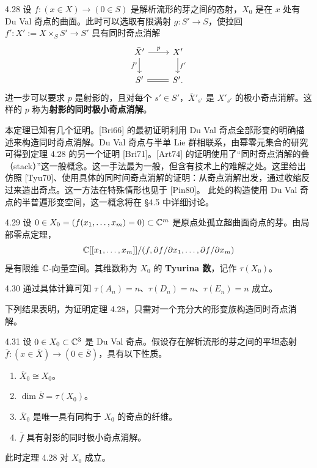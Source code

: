 \begin{theorem*}{4.28}
设 $f\colon (x\in X)\to(0\in S)$ 是解析流形的芽之间的态射，$X_0$ 是在 $x$ 处有 Du Val 奇点的曲面。此时可以选取有限满射 $g\colon S'\to S$，使拉回 $f'\colon X':=X\times_S S'\to S'$ 具有同时奇点消解
\[
\begin{tikzcd}
\bar X' \arrow[r,"p"] \arrow[d,"\bar f'"'] & X' \arrow[d,"f'"] \\
S' \arrow[r,equal] & S' .
\end{tikzcd}
\]
进一步可以要求 $p$ 是射影的，且对每个 $s'\in S'$，$\bar X'_{s'}$ 是 $X'_{s'}$ 的极小奇点消解。这样的 $p$ 称为\textbf{射影的同时极小奇点消解}。
\end{theorem*}

本定理已知有几个证明。[Bri66] 的最初证明利用 Du Val 奇点全部形变的明确描述来构造同时奇点消解。Du Val 奇点与半单 Lie 群相联系，由幂零元集合的研究可得到定理 4.28 的另一个证明 [Bri71]。[Art74] 的证明使用了“同时奇点消解的叠（stack）”这一般概念。这一手法最为一般，但含有技术上的难解之处。这里给出仿照 [Tyu70]、使用具体的同时间奇点消解的证明：从奇点消解出发，通过收缩反过来造出奇点。这一方法在特殊情形也见于 [Pin80]。
此处的构造使用 Du Val 奇点的半普遍形变空间，这一概念将在 \S4.5 中详细讨论。

\begin{definition}{4.29}
设 $0\in X_0=(f(x_1,\dots,x_m)=0)\subset\mathbb{C}^m$ 是原点处孤立超曲面奇点的芽。由局部零点定理，
\[
\mathbb{C}[[x_1,\dots,x_m]]/(f,\partial f/\partial x_1,\dots,\partial f/\partial x_m)
\]
是有限维 $\mathbb{C}$-向量空间。其维数称为 $X_0$ 的 \textbf{Tyurina 数}，记作 $\tau(X_0)$。
\end{definition}


\begin{example}{4.30}
通过具体计算可知 $\tau(A_n)=n$、$\tau(D_n)=n$、$\tau(E_n)=n$ 成立。
\end{example}

下列结果表明，为证明定理 4.28，只需对一个充分大的形变族构造同时奇点消解。

\begin{propositionp}{4.31}
设 $0\in X_0\subset\mathbb{C}^3$ 是 Du Val 奇点。假设存在解析流形的芽之间的平坦态射 $\bar f\colon (x\in\bar X)\to(0\in\bar S)$，具有以下性质。
\begin{enumerate}[label=(\arabic*),leftmargin=*]
\item $\bar X_0\cong X_0$。
\item $\dim\bar S=\tau(X_0)$。
\item $\bar X_0$ 是唯一具有同构于 $X_0$ 的奇点的纤维。
\item $\bar f$ 具有射影的同时极小奇点消解。
\end{enumerate}
此时定理 4.28 对 $X_0$ 成立。
\end{propositionp}

